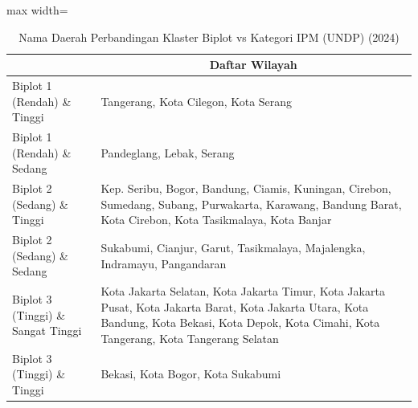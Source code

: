 \begin{table}[H]
\centering
\caption{Nama Daerah Perbandingan Klaster Biplot vs Kategori IPM (UNDP) (2024)} \label{tab:app2crossname2024}
\begin{adjustbox}{max width=\textwidth}
\begin{tabular}{|>{\centering\arraybackslash}p{4cm}|p{10cm}|}
\hline
\multicolumn{1}{|c|}{\textbf{Kategori}} & \multicolumn{1}{c|}{\textbf{Daftar Wilayah}} \\
\hline
Biplot 1 (Rendah) \& Tinggi & Tangerang, Kota Cilegon, Kota Serang \\
\hline
Biplot 1 (Rendah) \& Sedang & Pandeglang, Lebak, Serang \\
\hline
Biplot 2 (Sedang) \& Tinggi & Kep. Seribu, Bogor, Bandung, Ciamis, Kuningan, Cirebon, Sumedang, Subang, Purwakarta, Karawang, Bandung Barat, Kota Cirebon, Kota Tasikmalaya, Kota Banjar \\
\hline
Biplot 2 (Sedang) \& Sedang & Sukabumi, Cianjur, Garut, Tasikmalaya, Majalengka, Indramayu, Pangandaran \\
\hline
Biplot 3 (Tinggi) \& Sangat Tinggi & Kota Jakarta Selatan, Kota Jakarta Timur, Kota Jakarta Pusat, Kota Jakarta Barat, Kota Jakarta Utara, Kota Bandung, Kota Bekasi, Kota Depok, Kota Cimahi, Kota Tangerang, Kota Tangerang Selatan \\
\hline
Biplot 3 (Tinggi) \& Tinggi & Bekasi, Kota Bogor, Kota Sukabumi \\
\hline
\end{tabular}
\end{adjustbox}
\end{table}